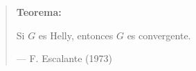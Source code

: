 \documentclass[beamer]{standalone}
\begin{document}
\begin{standaloneframe}
  \begin{quote}
    \textbf{Teorema:}

    Si $G$ es Helly, entonces $G$ es convergente.

    \hfill--- \color{purple} F. Escalante (1973)
  \end{quote}
\end{standaloneframe}
\end{document}
